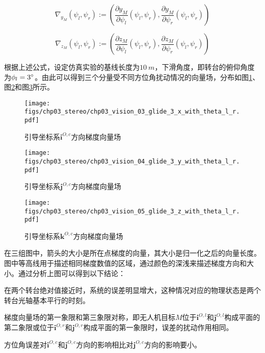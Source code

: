 \begin{equation}
\nabla_{y_M}(\psi_l, \psi_r):=\left( \frac{\partial y_M}{\partial \psi_l}(\psi_l, \psi_r), \frac{\partial y_M}{\partial \psi_r}(\psi_l, \psi_r)  \right)
\end{equation}

\begin{equation}
\nabla_{z_M}(\psi_l, \psi_r):=\left( \frac{\partial z_M}{\partial \psi_l}(\psi_l, \psi_r), \frac{\partial z_M}{\partial \psi_r}(\psi_l, \psi_r)  \right)
\end{equation}

根据上述公式，设定仿真实验的基线长度为$10\ m$，下滑角度，即转台的俯仰角度为$\phi_l=3\degree$。由此可以得到三个分量受不同方位角扰动情况的向量场，分布如图\ref{fig:chp03_vision_03_glide_3_x_with_theta_l_r}、图\ref{fig:chp03_vision_04_glide_3_y_with_theta_l_r}和图\ref{fig:chp03_vision_05_glide_3_z_with_theta_l_r}所示。

\begin{figure}[!tb]
	\centering
	\texttt{[image: figs/chp03\_stereo/chp03\_vision\_03\_glide\_3\_x\_with\_theta\_l\_r.pdf]}	
	\caption{引导坐标系$\mathbf{i}^{O,c}$方向梯度向量场}
	\label{fig:chp03_vision_03_glide_3_x_with_theta_l_r}
\end{figure}

\begin{figure}[!tb]
	\centering
	\texttt{[image: figs/chp03\_stereo/chp03\_vision\_04\_glide\_3\_y\_with\_theta\_l\_r.pdf]}	
	\caption{引导坐标系$\mathbf{j}^{O,c}$方向梯度向量场}
	\label{fig:chp03_vision_04_glide_3_y_with_theta_l_r}
\end{figure}

\begin{figure}[!tb]
	\centering
	\texttt{[image: figs/chp03\_stereo/chp03\_vision\_05\_glide\_3\_z\_with\_theta\_l\_r.pdf]}	
	\caption{引导坐标系$\mathbf{k}^{O,c}$方向梯度向量场}
	\label{fig:chp03_vision_05_glide_3_z_with_theta_l_r}
\end{figure}

在三组图中，箭头的大小是所在点梯度的向量，其大小是归一化之后的向量长度。图中等高线用于描述相同梯度数值的区域，通过颜色的深浅来描述梯度方向和大小。通过分析上图可以得到以下结论：
\begin{compactenum}
\item
在两个转台绝对值接近时，系统的误差明显增大，这种情况对应的物理状态是两个转台光轴基本平行的时刻。
\item
梯度向量场的第一象限和第三象限对称，即无人机目标$M$位于$\mathbf{i}^{O,l}$和$\mathbf{j}^{O,l}$构成平面的第二象限或位于$\mathbf{i}^{O,r}$和$\mathbf{j}^{O,r}$构成平面的第一象限时，误差的扰动作用相同。
\item
方位角误差对$\mathbf{i}^{O,c}$和$\mathbf{j}^{O,c}$方向的影响相比对$\mathbf{j}^{O,c}$方向的影响要小。
\end{compactenum}
 

